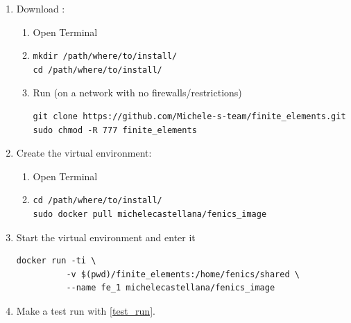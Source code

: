 \documentclass{article}
\begin{document}
\begin{enumerate}
\begin{enumerate}
                  \item Download \libname{}:
                        \begin{enumerate}
                              \item Open Terminal
                              \item
                                    \begin{verbatim}
mkdir /path/where/to/install/
cd /path/where/to/install/
                              \end{verbatim}
                              \item Run (on a network with no firewalls/restrictions)
                                    \begin{verbatim}
git clone https://github.com/Michele-s-team/finite_elements.git
sudo chmod -R 777 finite_elements
                                    \end{verbatim}
                        \end{enumerate}
                  \item Create the virtual environment:
                        \begin{enumerate}
                              \item Open Terminal
                              \item \begin{verbatim}
cd /path/where/to/install/
sudo docker pull michelecastellana/fenics_image
                  \end{verbatim}

                        \end{enumerate}

                  \item Start the virtual environment and enter it
                        \begin{verbatim}
docker run -ti \
          -v $(pwd)/finite_elements:/home/fenics/shared \
          --name fe_1 michelecastellana/fenics_image
\end{verbatim}
                  \item Make a test run with \cref{test_run}.
            \end{enumerate}
\end{enumerate}
\end{document}
